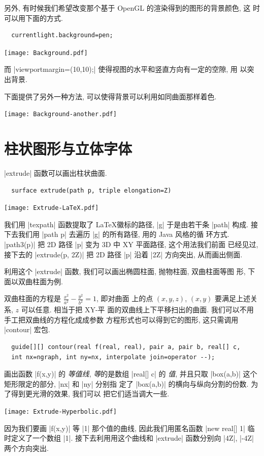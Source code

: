 \documentclass{ctexbook}
\begin{document}
另外, 有时候我们希望改变那个基于 OpenGL 的渲染得到的图形的背景颜色, 这
时可以用下面的方式.
\begin{lstlisting}
  currentlight.background=pen;
\end{lstlisting}
\begin{center}\texttt{[image: Background.pdf]}\end{center}%

而 |viewportmargin=(10,10);| 使得视图的水平和竖直方向有一定的空隙, 用
以突出背景.

下面提供了另外一种方法, 可以使得背景可以利用如同曲面那样着色.
\begin{center}\texttt{[image: Background-another.pdf]}\end{center}%


\section{柱状图形与立体字体}
|extrude| 函数可以画出柱状曲面.
\begin{lstlisting}
  surface extrude(path p, triple elongation=Z)
\end{lstlisting}\label{extrude}
\begin{center}\texttt{[image: Extrude-LaTeX.pdf]}\end{center}%

我们用 |texpath| 函数提取了 \LaTeX 徽标的路径, |g| 于是由若干条 |path|
构成. 接下去我们用 |path p| 去遍历 |g| 的所有路径, 用的 Java 风格的循
环方式. |path3(p)| 把 2D 路径 |p| 变为 3D 中 XY 平面路径, 这个用法我们前面
已经见过, 接下去的 |extrude(p, 2Z)| 把 2D 路径 |p| 沿着 |2Z| 方向突出,
从而画出侧面.

利用这个 |extrude| 函数, 我们可以画出椭圆柱面, 抛物柱面, 双曲柱面等图
形, 下面以双曲柱面为例.

双曲柱面的方程是 $\frac{x^{2}}{a^{2}}-\frac{y^{2}}{b^{2}}=1$, 即对曲面
上的点 $(x,y,z)$, $(x,y)$ 要满足上述关系, $z$ 可以任意. 相当于把 XY-平
面的双曲线上下平移扫出的曲面. 我们可以不用手工把双曲线的方程化成成参数
方程形式也可以得到它的图形, 这只需调用 |contour| 宏包.
\begin{lstlisting}
  guide[][] contour(real f(real, real), pair a, pair b, real[] c,
  int nx=ngraph, int ny=nx, interpolate join=operator --);
\end{lstlisting}
画出函数 |f(x,y)| 的 \emph{等值线}, \emph{等}的是数组 |real[] c| 的
\emph{值}, 并且只取 |box(a,b)| 这个矩形限定的部分, |nx| 和 |ny| 分别指
定了 |box(a,b)| 的横向与纵向分割的份数. 为了得到更光滑的效果, 我们可以
把它们适当调大一些.
\begin{center}\texttt{[image: Extrude-Hyperbolic.pdf]}\end{center}%

因为我们要画 |f(x,y)| 等 |1| 那个值的曲线, 因此我们用匿名函数
|new real[] {1}| 临时定义了一个数组 |{1}|. 接下去利用用这个曲线和 |extrude|
函数分别向 |4Z|, |-4Z| 两个方向突出.
\end{document}
